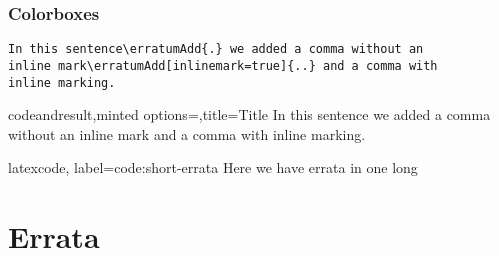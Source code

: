 \documentclass[a4paper,12pt]{report}
\begin{document}
\subsection{Colorboxes}\label{subsect-Colorboxes}

\begin{lstlisting}
In this sentence\erratumAdd{.} we added a comma without an
inline mark\erratumAdd[inlinemark=true]{..} and a comma with
inline marking.
\end{lstlisting}



\begin{examplecode}{codeandresult,minted options={},title=Title}
In this sentence\erratumAdd{,} we added a comma without an
inline mark\erratumAdd[inlinemark=true]{,} and a comma with
inline marking.
\end{examplecode}



\begin{examplecode}{latexcode, label={code:short-errata}}
Here we have  errata in one
 long 
\end{examplecode}

\chapter{Errata}\label{chap:errata}

\PrintErrata
\end{document}
